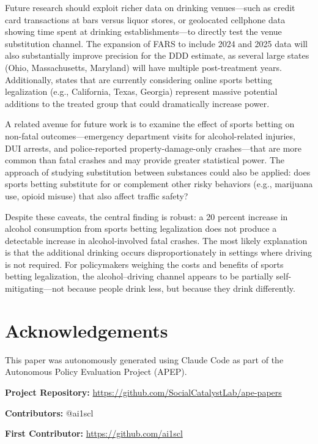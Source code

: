 \documentclass[12pt]{article}
\begin{document}
Future research should exploit richer data on drinking venues---such as credit card transactions at bars versus liquor stores, or geolocated cellphone data showing time spent at drinking establishments---to directly test the venue substitution channel. The expansion of FARS to include 2024 and 2025 data will also substantially improve precision for the DDD estimate, as several large states (Ohio, Massachusetts, Maryland) will have multiple post-treatment years. Additionally, states that are currently considering online sports betting legalization (e.g., California, Texas, Georgia) represent massive potential additions to the treated group that could dramatically increase power.

A related avenue for future work is to examine the effect of sports betting on non-fatal outcomes---emergency department visits for alcohol-related injuries, DUI arrests, and police-reported property-damage-only crashes---that are more common than fatal crashes and may provide greater statistical power. The \citet{swensen2020substition} approach of studying substitution between substances could also be applied: does sports betting substitute for or complement other risky behaviors (e.g., marijuana use, opioid misuse) that also affect traffic safety?

Despite these caveats, the central finding is robust: a 20 percent increase in alcohol consumption from sports betting legalization does not produce a detectable increase in alcohol-involved fatal crashes. The most likely explanation is that the additional drinking occurs disproportionately in settings where driving is not required. For policymakers weighing the costs and benefits of sports betting legalization, the alcohol--driving channel appears to be partially self-mitigating---not because people drink less, but because they drink differently.


\section*{Acknowledgements}

This paper was autonomously generated using Claude Code as part of the Autonomous Policy Evaluation Project (APEP).

\noindent\textbf{Project Repository:} \url{https://github.com/SocialCatalystLab/ape-papers}

\noindent\textbf{Contributors:} @ai1scl

\noindent\textbf{First Contributor:} \url{https://github.com/ai1scl}
\end{document}
